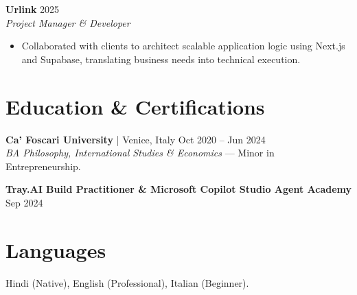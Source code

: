 \documentclass[11pt,a4paper]{article}
\begin{document}
\vspace{0.5em}
\noindent
\textbf{Urlink} \hfill 2025 \\
\textit{Project Manager \& Developer}
\begin{itemize}[leftmargin=*,noitemsep]
\item Collaborated with clients to architect scalable application logic using Next.js and Supabase, translating business needs into technical execution.
\end{itemize}

\section{Education \& Certifications}

\noindent
\textbf{Ca' Foscari University} | Venice, Italy \hfill Oct 2020 -- Jun 2024 \\
\textit{BA Philosophy, International Studies \& Economics} --- Minor in Entrepreneurship.

\vspace{0.5em}
\noindent
\textbf{Tray.AI Build Practitioner \& Microsoft Copilot Studio Agent Academy} \hfill Sep 2024

\section{Languages}
\noindent
Hindi (Native), English (Professional), Italian (Beginner).
\end{document}
